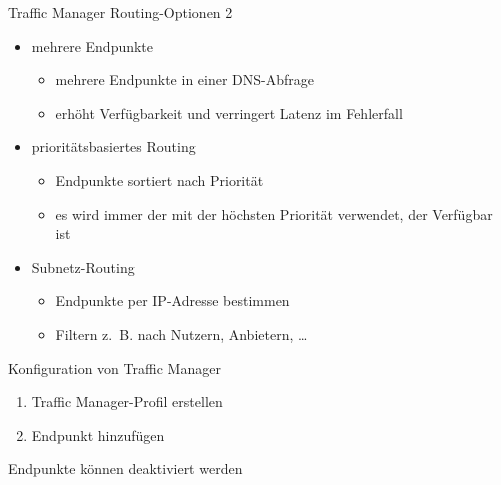 \begin{flashcard}[Definition]{Traffic Manager Routing-Optionen 2}
    \begin{itemize}
        \item mehrere Endpunkte
            \begin{itemize}
                \item mehrere Endpunkte in einer DNS-Abfrage
                \item erhöht Verfügbarkeit und verringert Latenz im Fehlerfall
            \end{itemize}
        \item prioritätsbasiertes Routing
            \begin{itemize}
                \item Endpunkte sortiert nach Priorität
                \item es wird immer der mit der höchsten Priorität verwendet, der Verfügbar ist
            \end{itemize}
        \item Subnetz-Routing
            \begin{itemize}
                \item Endpunkte per IP-Adresse bestimmen
                \item Filtern z.\,  B. nach Nutzern, Anbietern, \ldots
            \end{itemize}
    \end{itemize}
\end{flashcard}

\begin{flashcard}[Definition]{Konfiguration von Traffic Manager}
    \begin{enumerate}
        \item Traffic Manager-Profil erstellen
        \item Endpunkt hinzufügen
    \end{enumerate}
    \vspace{1cm}
    Endpunkte können deaktiviert werden
\end{flashcard}

